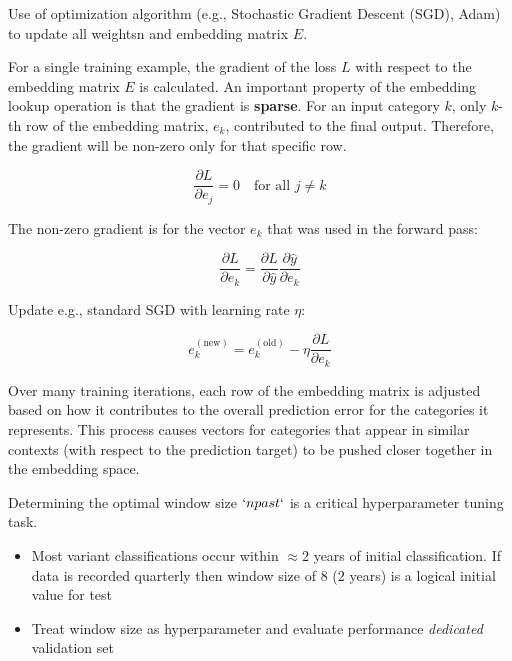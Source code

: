 \documentclass[../main.tex]{subfiles}
\begin{document}
Use of optimization algorithm  (e.g., Stochastic Gradient Descent (SGD), Adam) to update all weightsn and embedding matrix $E$.

For a single training example, the gradient of the loss $L$ with respect to the embedding matrix $E$ is calculated. An important property of the embedding lookup operation is that the gradient is \textbf{sparse}. For an input category $k$, only $k$-th row of the embedding matrix, $e_k$, contributed to the final output. Therefore, the gradient will be non-zero only for that specific row.

\begin{equation}
    \frac{\partial L}{\partial e_j} = 0 \quad \text{for all } j \neq k
\end{equation}

The non-zero gradient is for the vector $e_k$ that was used in the forward pass:

\begin{equation}
    \frac{\partial L}{\partial e_k} = \frac{\partial L}{\partial \hat{y}} \frac{\partial \hat{y}}{\partial e_k}
\end{equation}

Update e.g., standard SGD with learning rate $\eta$:

\begin{equation}
    e_k^{(\text{new})} = e_k^{(\text{old})} - \eta \frac{\partial L}{\partial e_k}
\end{equation}

Over many training iterations, each row of the embedding matrix is adjusted based on how it contributes to the overall prediction error for the categories it represents. This process causes vectors for categories that appear in similar contexts (with respect to the prediction target) to be pushed closer together in the embedding space.

\vspace{0.3cm}

Determining the optimal window size $`n past`$ is a critical hyperparameter tuning task.
\begin{itemize}
    \item Most variant classifications occur within $\approx2$ years of initial classification. If data is recorded quarterly then window size of $8$ ($2$ years) is a logical initial value for test
    \item Treat window size as hyperparameter and evaluate performance \textit{dedicated} validation set
\end{itemize}
\end{document}
